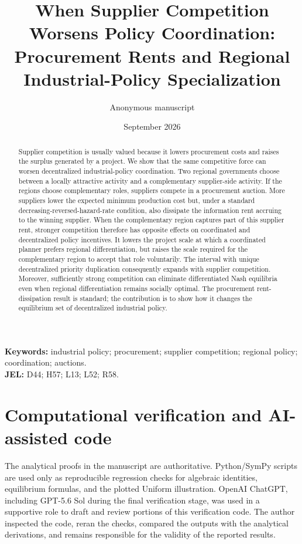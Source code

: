 \documentclass[11pt]{article}
\title{When Supplier Competition Worsens Policy Coordination:\\Procurement Rents and Regional Industrial-Policy Specialization}
\author{Anonymous manuscript}
\date{September 2026}
\newcommand{\1}{\mathbf{1}}
\begin{document}
\maketitle

\begin{abstract}
Supplier competition is usually valued because it lowers procurement costs and raises the surplus generated by a project. We show that the same competitive force can worsen decentralized industrial-policy coordination. Two regional governments choose between a locally attractive activity and a complementary supplier-side activity. If the regions choose complementary roles, suppliers compete in a procurement auction. More suppliers lower the expected minimum production cost but, under a standard decreasing-reversed-hazard-rate condition, also dissipate the information rent accruing to the winning supplier. When the complementary region captures part of this supplier rent, stronger competition therefore has opposite effects on coordinated and decentralized policy incentives. It lowers the project scale at which a coordinated planner prefers regional differentiation, but raises the scale required for the complementary region to accept that role voluntarily. The interval with unique decentralized priority duplication consequently expands with supplier competition. Moreover, sufficiently strong competition can eliminate differentiated Nash equilibria even when regional differentiation remains socially optimal. The procurement rent-dissipation result is standard; the contribution is to show how it changes the equilibrium set of decentralized industrial policy.
\end{abstract}

\noindent\textbf{Keywords:} industrial policy; procurement; supplier competition; regional policy; coordination; auctions.\\
\textbf{JEL:} D44; H57; L13; L52; R58.











\appendix


\section*{Computational verification and AI-assisted code}
The analytical proofs in the manuscript are authoritative. Python/SymPy scripts are used only as reproducible regression checks for algebraic identities, equilibrium formulas, and the plotted Uniform illustration. OpenAI ChatGPT, including GPT-5.6 Sol during the final verification stage, was used in a supportive role to draft and review portions of this verification code. The author inspected the code, reran the checks, compared the outputs with the analytical derivations, and remains responsible for the validity of the reported results.
\end{document}
